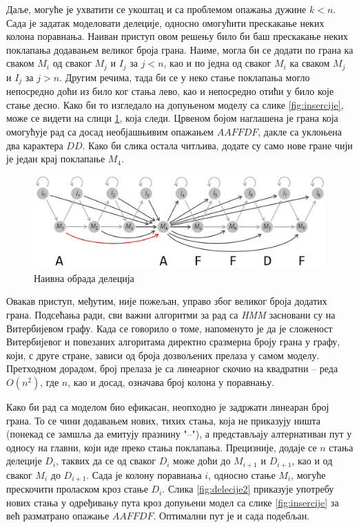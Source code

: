 \documentclass[12pt,oneside]{memoir}
\begin{document}
\begin{CJK}{UTF8}{ipxm}
Даље, могуће је ухватити се укоштац и са проблемом опажања дужине $k < n$. Сада је задатак моделовати делеције, односно омогућити прескакање неких колона поравнања. Наиван приступ овом решењу било би баш прескакање неких поклапања додавањем великог броја грана. Наиме, могла би се додати по грана ка сваком $M_i$ од сваког $M_j$ и $I_j$ за $j < n$, као и по једна од сваког $M_i$ ка сваком $M_j$ и $I_j$ за $j > n$. Другим речима, тада би се у неко стање поклапања могло непосредно доћи из било ког стања лево, као и непосредно отићи у било које стање десно. Како би то изгледало на допуњеном моделу са слике \ref{fig:insercije}, може се видети на слици \ref{fig:delecije1}, која следи. Црвеном бојом наглашена је грана која омогућује рад са досад необјашњивим опажањем $AAFFDF$, дакле са уклоњена два карактера $DD$. Како би слика остала читљива, додате су само нове гране чији је један крај поклапање $M_4$.

\begin{figure}[H]
  \centering
  \includegraphics[width=\textwidth]{delecije1.png}
  \caption{Наивна обрада делеција \cite{compeau2015}}
  \label{fig:delecije1}
\end{figure}

Овакав приступ, међутим, није пожељан, управо због великог броја додатих грана. Подсећања ради, сви важни алгоритми за рад са \textit{HMM} засновани су на Витербијевом графу. Када се говорило о томе, напоменуто је да је сложеност Витербијевог и повезаних алгоритама директно сразмерна броју грана у графу, који, с друге стране, зависи од броја дозвољених прелаза у самом моделу. Претходном дорадом, број прелаза је са линеарног скочио на квадратни -- реда $O(n^2)$, где $n$, као и досад, означава број колона у поравнању.

Како би рад са моделом био ефикасан, неопходно је задржати линеаран број грана. То се чини додавањем нових, тихих стања, која не приказују ништа (понекад се замшља да емитују празнину "--"), а представљају алтернативан пут у односу на главни, који иде преко стања поклапања. Прецизније, додаје се $n$ стања делеције $D_i$, таквих да се од сваког $D_i$ може доћи до $M_{i+1}$ и $D_{i+1}$, као и од сваког $M_i$ до $D_{i+1}$. Сада је колону поравнања $i$, односно стање $M_i$, могуће прескочити проласком кроз стање $D_i$. Слика \ref{fig:delecije2} приказује употребу нових стања у одређивању пута кроз допуњени модел са слике \ref{fig:insercije} за већ разматрано опажање $AAFFDF$. Оптимални пут је и сада подебљан.


\end{CJK}
\end{document}
